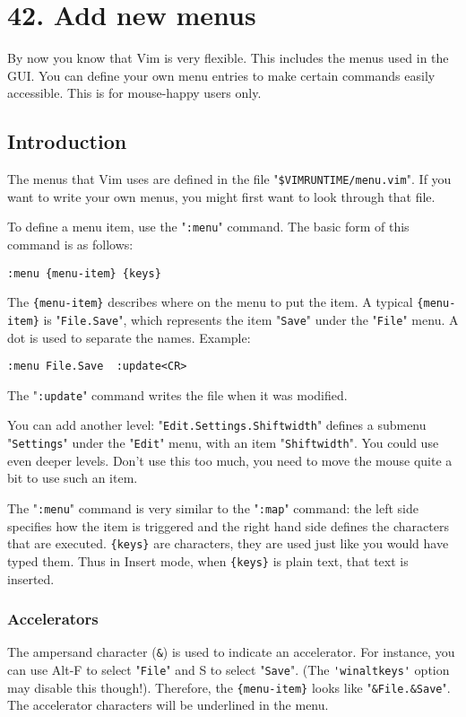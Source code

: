 \section{42. Add new menus}
By now you know that Vim is very flexible.
This includes the menus used in the GUI.
You can define your own menu entries to make certain commands easily accessible.
This is for mouse-happy users only.
\subsection{Introduction}
The menus that Vim uses are defined in the file "\verb!$VIMRUNTIME/menu.vim!".
If you want to write your own menus, you might first want to look through that file.

To define a menu item, use the "\verb!:menu!" command.
The basic form of this command is as follows:

\begin{Verbatim}[samepage=true]
 :menu {menu-item} {keys}
\end{Verbatim}

The \verb!{menu-item}! describes where on the menu to put the item.
A typical \verb!{menu-item}! is "\verb!File.Save!", which represents the item "\verb!Save!" under the "\verb!File!" menu.
A dot is used to separate the names.
Example:

\begin{Verbatim}[samepage=true]
 :menu File.Save  :update<CR>
\end{Verbatim}

The "\verb!:update!" command writes the file when it was modified.

You can add another level: "\verb!Edit.Settings.Shiftwidth!" defines a submenu "\verb!Settings!" under the "\verb!Edit!" menu, with an item "\verb!Shiftwidth!".
You could use even deeper levels.
Don't use this too much, you need to move the mouse quite a bit to use such an item.

The "\verb!:menu!" command is very similar to the "\verb!:map!" command: the left side specifies how the item is triggered and the right hand side defines the characters that are executed.
\verb!{keys}! are characters, they are used just like you would have typed them.
Thus in Insert mode, when \verb!{keys}! is plain text, that text is inserted.

\subsubsection{Accelerators}
The ampersand character (\verb!&!) is used to indicate an accelerator.
For instance, you can use Alt-F to select "\verb!File!" and S to select "\verb!Save!".
(The \verb!'winaltkeys'! option may disable this though!).
Therefore, the \verb!{menu-item}! looks like "\verb!&File.&Save!".
The accelerator characters will be underlined in the menu.

